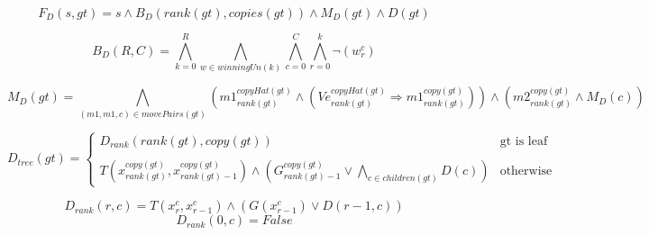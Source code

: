 \documentclass[a4paper,10pt]{article}
\begin{document}
$$
F_D(s, gt) = s \land B_D(rank(gt), copies(gt)) \land M_D(gt) \land D(gt)
$$

$$
B_D(R, C) = \bigwedge\limits_{k = 0}^R \bigwedge\limits_{w \in winningUn(k)} \bigwedge\limits_{c = 0}^C \bigwedge\limits_{r = 0}^k \lnot(w_r^c)
$$


$$
M_D(gt) = \bigwedge\limits_{(m1, m1, c) \in movePairs(gt)} (m1_{rank(gt)}^{copyHat(gt)} \land (Ve_{rank(gt)}^{copyHat(gt)} \Rightarrow m1_{rank(gt)}^{copy(gt)})) \land (m2_{rank(gt)}^{copy(gt)} \land M_D(c))
$$

\[
D_{tree}(gt) = 
\begin{cases}
    D_{rank}(rank(gt), copy(gt)) & \text{gt is leaf} \\
    \\
    T(x_{rank(gt)}^{copy(gt)}, x_{rank(gt)-1}^{copy(gt)}) \land (G_{rank(gt)-1}^{copy(gt)} \lor \bigwedge\limits_{c \in children(gt)} D(c)) & \text{otherwise}
\end{cases}
\]

\[
    D_{rank}(r, c) = T(x_r^{c}, x_{r-1}^{c}) \land (G(x_{r-1}^{c}) \lor D(r-1, c))
\]
\[
    D_{rank}(0, c) = False
\]
\end{document}
